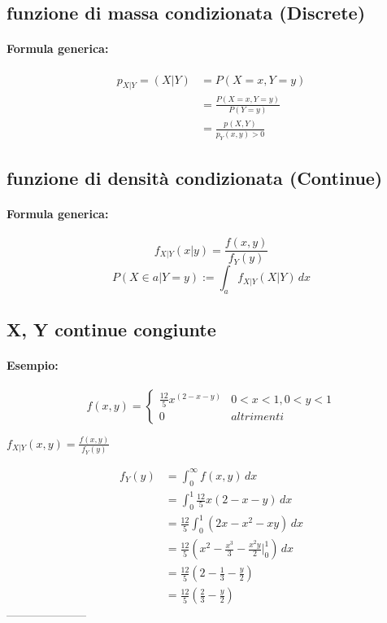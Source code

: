 \documentclass[]{article}
\newcommand{\formula}{\paragraph{Formula generica:}}
\begin{document}
    \subsection{funzione di massa condizionata (Discrete)}
    \formula
    \begin{equation*}
        \begin{split}
            p_{X|Y} = (X | Y) & = P (X=x, Y=y) \\
            & = \frac{P(X=x, Y=y)}{P(Y=y)} \\
            & = \frac{p(X,Y)}{p_Y(x, y) > 0} 
        \end{split}
    \end{equation*}

    \subsection{funzione di densità condizionata (Continue)}
    \formula
    \[ f_{X|Y}(x | y) = \frac{f(x, y)}{f_Y(y)}\]
    \[ P(X \in a | Y = y) := \int_{a}^{} f_{X|Y}(X | Y) \, dx \]

    \subsection{X, Y continue congiunte}
    \paragraph{Esempio:}
    \begin{equation*}
        f(x,y) =
        \begin{cases}
            \frac{12}{5} x^{(2-x-y)} & 0 < x < 1, 0 < y < 1 \\
            0 & altrimenti
        \end{cases}
    \end{equation*}

    $ f_{X|Y}(x,y) = \frac{f(x,y)}{f_Y(y)} $

    \begin{equation*}
        \begin{split}
            f_Y(y) & = \int_{0}^{\infty} f(x,y) \, dx \\
            & = \int_{0}^{1} \frac{12}{5} x(2-x-y) \, dx \\
            & = \frac{12}{5} \int_{0}^{1} (2x - x^2 - xy) \, dx \\
            & = \frac{12}{5} (x^2 - \frac{x^3}{3} - \frac{x^2y}{2} \bigg\rvert_{0}^{1} )  \, dx \\
            & = \frac{12}{5} (2 - \frac{1}{3} - \frac{y}{2}) \\
            & = \frac{12}{5} (\frac{2}{3} - \frac{y}{2})
        \end{split}
    \end{equation*}
    ---------------------
\end{document}
